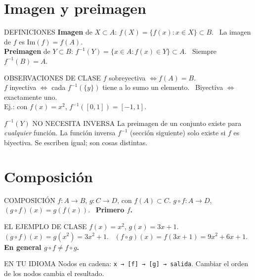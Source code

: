 \section{Imagen y preimagen}
\apuntes
\begin{sello}{DEFINICIONES}
\textbf{Imagen} de $X\subset A$: $f(X)=\{f(x):x\in X\}\subset B$. \ La imagen de $f$ es $\mathrm{Im}(f)=f(A)$.\\[3pt]
\textbf{Preimagen} de $Y\subset B$: $f^{-1}(Y)=\{x\in A: f(x)\in Y\}\subset A$. \ Siempre $f^{-1}(B)=A$.
\end{sello}
\begin{memo}{OBSERVACIONES DE CLASE}
$f$ sobreyectiva $\iff f(A)=B$.\\
$f$ inyectiva $\iff$ cada $f^{-1}(\{y\})$ tiene a lo sumo un elemento. \ Biyectiva $\iff$ exactamente uno.\\
Ej.: con $f(x)=x^2$, $f^{-1}([0,1])=[-1,1]$.
\end{memo}
\begin{trampa}{$f^{-1}(Y)$ NO NECESITA INVERSA}
La preimagen de un conjunto existe para \emph{cualquier} función. La función inversa $f^{-1}$ (sección siguiente) solo existe si $f$ es biyectiva. Se escriben igual; son cosas distintas.
\end{trampa}

\section{Composición}
\apuntes
\begin{sello}{COMPOSICIÓN}
$f:A\to B$, $g:C\to D$, con $f(A)\subset C$. \quad $g\circ f:A\to D$, \ $(g\circ f)(x)=g(f(x))$. \ \textbf{Primero $f$.}
\end{sello}
\begin{memo}{EL EJEMPLO DE CLASE}
$f(x)=x^2$, $g(x)=3x+1$. \ $(g\circ f)(x)=g(x^2)=3x^2+1$. \ $(f\circ g)(x)=f(3x+1)=9x^2+6x+1$.\\
\textbf{En general $g\circ f\neq f\circ g$.}
\end{memo}
\begin{tip}{EN TU IDIOMA}
Nodos en cadena: \texttt{x → [f] → [g] → salida}. Cambiar el orden de los nodos cambia el resultado.
\end{tip}

